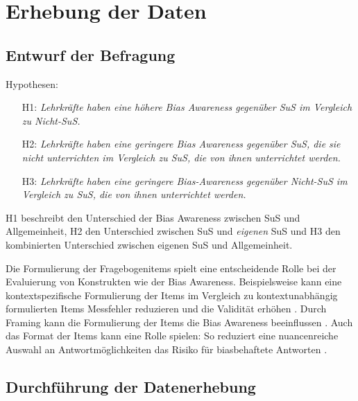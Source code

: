 \chapter{Erhebung der Daten}

\section{Entwurf der Befragung}

Hypothesen:

\begin{enumerate}
	\item[H1:] \emph{Lehrkräfte haben eine höhere Bias Awareness gegenüber SuS im Vergleich zu Nicht-SuS.}
	\item[H2:] \emph{Lehrkräfte haben eine geringere Bias Awareness gegenüber SuS, die sie nicht unterrichten im Vergleich zu SuS, die von ihnen unterrichtet werden.}
	\item[H3:] \emph{Lehrkräfte haben eine geringere Bias-Awareness gegenüber Nicht-SuS im Vergleich zu SuS, die von ihnen unterrichtet werden.}
\end{enumerate}

H1 beschreibt den Unterschied der Bias Awareness zwischen SuS und Allgemeinheit, H2 den Unterschied zwischen SuS und \emph{eigenen} SuS und H3 den kombinierten Unterschied zwischen eigenen SuS und Allgemeinheit.

Die Formulierung der Fragebogenitems spielt eine entscheidende Rolle bei der Evaluierung von Konstrukten wie der Bias Awareness.
Beispielsweise kann eine kontextspezifische Formulierung der Items im Vergleich zu kontextunabhängig formulierten Items Messfehler reduzieren und die Validität erhöhen \citep{bing2004incremental}.
Durch Framing kann die Formulierung der Items die Bias Awareness beeinflussen \citep{rohner2013reducing}.
Auch das Format der Items kann eine Rolle spielen:
So reduziert eine nuancenreiche Auswahl an Antwortmöglichkeiten das Risiko für biasbehaftete Antworten \citep{elson2017question}.


\section{Durchführung der Datenerhebung}